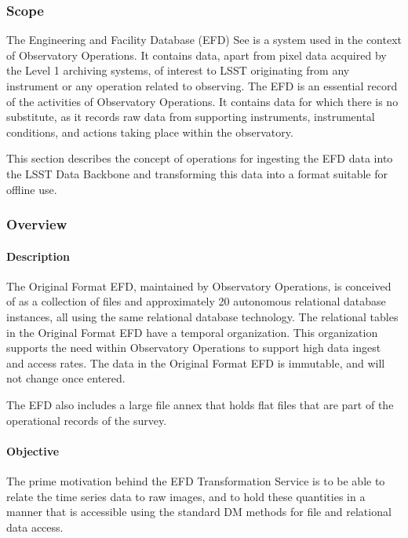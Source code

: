 \subsubsection{Scope}

The Engineering and Facility Database (EFD) See  is a system used in the
context of Observatory Operations. It contains data, apart from pixel
data acquired by the Level 1 archiving systems, of interest to LSST
originating from any instrument or any operation related to
observing. The EFD is an essential record of the activities of
Observatory Operations. It contains data for which there is no
substitute, as it records raw data from supporting instruments,
instrumental conditions, and actions taking place within the
observatory.

This section describes the concept of operations for ingesting the
EFD data into the LSST Data Backbone and transforming this data
into a format suitable for offline use.

\subsubsection{Overview}

\paragraph{Description}

The Original Format EFD, maintained by Observatory Operations, is
conceived of as a collection of files and approximately 20 autonomous
relational database instances, all using the same relational database
technology. The relational tables in the Original Format EFD have a
temporal organization. This organization supports the need within
Observatory Operations to support high data ingest and access
rates. The data in the Original Format EFD is immutable, and will not
change once entered.

The EFD also includes a large file annex that holds flat files that
are part of the operational records of the survey.

\paragraph{Objective}

The prime motivation behind the EFD Transformation Service is to be able to
relate the time series data to raw images, and to hold these quantities in
a manner that is accessible using the standard DM methods for file and
relational data access.

